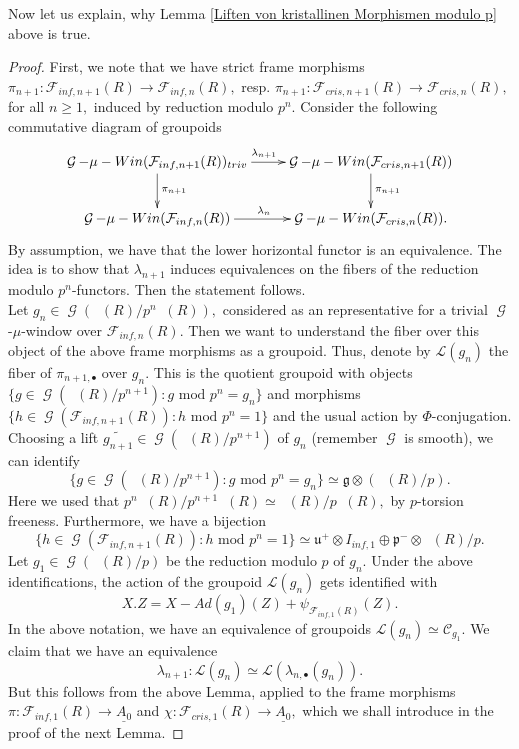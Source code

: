\documentclass[a4paper,10,5 pt]{amsart}
\theoremstyle{definition}
\DeclareMathOperator{\Ainf}{\mathbb{A}_{inf}}
\DeclareMathOperator{\G}{\mathcal{G}}
\begin{document}
Now let us explain, why Lemma \ref{Liften von kristallinen Morphismen modulo p} above is true.
\begin{proof}
First, we note that we have strict frame morphisms
$
\pi_{n+1}\colon \mathcal{F}_{inf,n+1}(R)\rightarrow \mathcal{F}_{inf,n}(R),
$ resp. $\pi_{n+1}\colon \mathcal{F}_{cris,n+1}(R)\rightarrow \mathcal{F}_{cris,n}(R),$ for all $n\geq 1,$ induced by reduction modulo $p^{n}.$ Consider the following commutative diagram of groupoids
$$
\xymatrix{
\G-\mu-Win(\mathcal{F}_{inf,n+1}(R))_{triv} \ar[r]^{\lambda_{n+1}} \ar[d]^{\pi_{n+1}} & \G-\mu-Win(\mathcal{F}_{cris,n+1}(R)) \ar[d]^{\pi_{n+1}} \\
\G-\mu-Win(\mathcal{F}_{inf,n}(R)) \ar[r]^{\lambda_{n}} & \G-\mu-Win(\mathcal{F}_{cris,n}(R)).
}
$$ By assumption, we have that the lower horizontal functor is an equivalence. The idea is to show that $\lambda_{n+1}$ induces equivalences on the fibers of the reduction modulo $p^{n}$-functors. Then the statement follows.
\\
Let $g_{n}\in \G(\Ainf(R)/p^{n}\Ainf(R)),$ considered as an representative for a trivial $\G$-$\mu$-window over $\mathcal{F}_{inf,n}(R).$ Then we want to understand the fiber over this object of the above frame morphisms as a groupoid. Thus, denote by $\mathcal{L}(g_{n})$ the fiber of $\pi_{n+1,\bullet}$ over $g_{n}.$ This is the quotient groupoid with objects $\lbrace g\in \G(\Ainf(R)/p^{n+1})\colon g \text{ mod }p^{n}=g_{n} \rbrace$ and morphisms $\lbrace h \in \G(\mathcal{F}_{inf,n+1}(R))\colon h\text{ mod }p^{n}=1 \rbrace$ and the usual action by $\Phi$-conjugation. Choosing a lift $\tilde{g_{n+1}}\in \G(\Ainf(R)/p^{n+1})$ of $g_{n}$ (remember $\G$ is smooth), we can identify
$$\lbrace g\in \G(\Ainf(R)/p^{n+1})\colon g \text{ mod }p^{n}=g_{n} \rbrace \simeq \mathfrak{g}\otimes (\Ainf(R)/p).$$
Here we used that $p^{n}\Ainf(R)/p^{n+1}\Ainf(R)\simeq \Ainf(R)/p\Ainf(R),$ by $p$-torsion freeness.
Furthermore, we have a bijection
$$
\lbrace h \in \G(\mathcal{F}_{inf,n+1}(R))\colon h\text{ mod }p^{n}=1 \rbrace \simeq \mathfrak{u}^{+} \otimes I_{inf,1} \oplus \mathfrak{p}^{-} \otimes \Ainf(R)/p.
$$ Let $g_{1}\in \G(\Ainf(R)/p)$ be the reduction modulo $p$ of $g_{n}.$ Under the above identifications, the action of the groupoid $\mathcal{L}(g_{n})$ gets identified with
$$
X.Z=X-Ad(g_{1})(Z)+\psi_{\mathcal{F}_{inf,1}(R)}(Z).
$$
In the above notation, we have an equivalence of groupoids
$
\mathcal{L}(g_{n})\simeq \mathcal{C}_{g_{1}}.
$  We claim that we have an equivalence
$$
\lambda_{n+1}\colon \mathcal{L}(g_{n})\simeq \mathcal{L}(\lambda_{n,\bullet}(g_{n})).
$$
But this follows from the above Lemma, applied to the frame morphisms $\pi\colon\mathcal{F}_{inf,1}(R)\rightarrow \underline{A_{0}}$ and $\chi\colon\mathcal{F}_{cris,1}(R)\rightarrow \underline{A_{0}},$ which we shall introduce in the proof of the next Lemma.
\end{proof}
\end{document}
